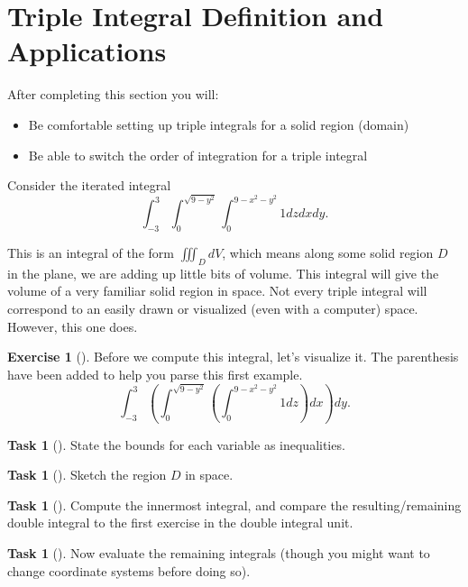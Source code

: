 \documentclass[10pt,]{book}
\theoremstyle{plain}
\theoremstyle{definition}
\theoremstyle{definition}
\theoremstyle{definition}
\theoremstyle{definition}
\newtheorem{exploration}[project]{Exercise}
\newtheorem{task}[project]{Task}
\theoremstyle{definition}
\numberwithin{equation}{section}
\newcommand{\ds}{\displaystyle}
\begin{document}
\section[{Triple Integral Definition and Applications}]{Triple Integral Definition and Applications}\label{section-45}
After completing this section you will: \leavevmode%
\begin{itemize}[label=\textbullet]
\item{}Be comfortable setting up triple integrals for a solid region (domain)%
\item{}Be able to switch the order of integration for a triple integral%
\end{itemize}
%
\par
Consider the iterated integral%
\begin{equation*}
\ds \int_{-3}^3 \int_0^{\sqrt{9-y^2}}\int_0^{9-x^2-y^2} 1dzdxdy.
\end{equation*}
%
\par
This is an integral of the form \(\iiint_D dV\), which means along some solid region \(D\) in the plane, we are adding up little bits of volume. This integral will give the volume of a very familiar solid region in space. Not every triple integral will correspond to an easily drawn or visualized (even with a computer) space. However, this one does.%
\begin{exploration}[]\label{exploration-296}
Before we compute this integral, let's visualize it. The parenthesis have been added to help you parse this first example.%
\begin{equation*}
\ds \int_{-3}^3 (\int_0^{\sqrt{9-y^2}} (\int_0^{9-x^2-y^2} 1dz) dx ) dy.
\end{equation*}
%
\begin{task}[]\label{task-807}
State the bounds for each variable as inequalities.%
\end{task}
\begin{task}[]\label{task-808}
Sketch the region \(D\) in space.%
\end{task}
\begin{task}[]\label{task-809}
Compute the innermost integral, and compare the resulting/remaining double integral to the first exercise in the double integral unit.%
\end{task}
\begin{task}[]\label{task-810}
Now evaluate the remaining integrals (though you might want to change coordinate systems before doing so).%
\end{task}
\end{exploration}
\end{document}
